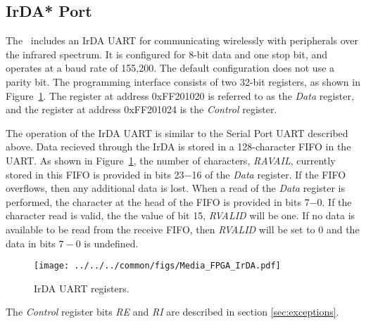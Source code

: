 \subsection{IrDA* Port}
\label{sec:irda_port}

The \systemName~includes an IrDA UART for communicating wirelessly with peripherals over 
the infrared spectrum. It is configured for 8-bit data and one stop bit, and operates at a baud 
rate of 155,200. The default configuration does not use a parity bit. The programming interface 
consists of two 32-bit registers, as shown in Figure~\ref{fig:irda_port}. The register at 
address {\sf 0xFF201020} is referred to as the {\it Data} register, and the register at 
address {\sf 0xFF201024} is the {\it Control} register. 

The operation of the IrDA UART is similar to the Serial Port UART described above. Data recieved 
through the IrDA is stored in a 128-character FIFO in the UART. As shown in 
Figure~\ref{fig:irda_port}, the number of characters, {\it RAVAIL}, currently stored in this FIFO 
is provided in bits 23$-$16 of the {\it Data} register. If the FIFO overflows, then any 
additional data is lost. When a read of the {\it Data} register is performed, the character
at the head of the FIFO is provided in bits 7$-$0. If the character read is valid, the the value 
of bit 15, {\it RVALID} will be one. If no data is available to be read from the receive FIFO, 
then {\it RVALID} will be set to 0 and the data in bits $7-0$ is undefined. 

\begin{figure}[h!]
   \begin{center}
       \texttt{[image: ../../../common/figs/Media\_FPGA\_IrDA.pdf]}
   \end{center}
   \caption{IrDA UART registers.}
	\label{fig:irda_port}
\end{figure}

The {\it Control} register bits {\it RE} and {\it RI} are described in section \ref{sec:exceptions}.